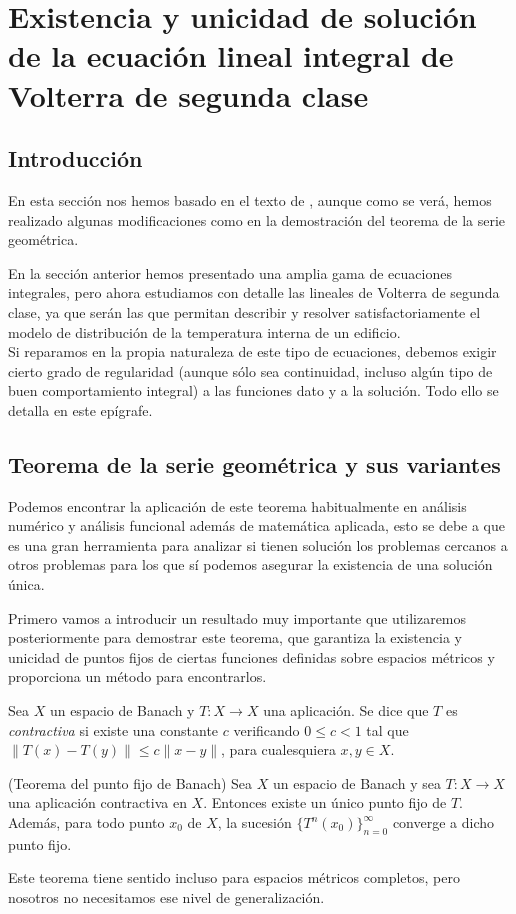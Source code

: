 \chapter{Existencia y unicidad de solución de la ecuación lineal integral de Volterra de segunda clase}
\section{Introducción}
En esta sección nos hemos basado en el texto de \cite{Atkinson}, aunque como se verá, hemos realizado algunas modificaciones como en la demostración del teorema de la serie geométrica.

En la sección anterior hemos presentado una amplia gama de ecuaciones integrales, pero ahora estudiamos con detalle las lineales de Volterra de segunda clase, ya que serán las que permitan describir y resolver satisfactoriamente el modelo de distribución de la temperatura interna de un edificio.\\ Si reparamos en la propia naturaleza de este tipo de ecuaciones, debemos exigir cierto grado de regularidad (aunque sólo sea continuidad, incluso algún tipo de buen comportamiento integral) a las funciones dato y a la solución. Todo ello se detalla en este epígrafe.
\section{Teorema de la serie geométrica y sus variantes}
Podemos encontrar la aplicación de este teorema habitualmente en análisis numérico y análisis funcional además de matemática aplicada, esto se debe a que es una gran herramienta para analizar si tienen solución los problemas cercanos a otros problemas para los que sí podemos asegurar la existencia de una solución única.

Primero vamos a introducir un resultado muy importante que utilizaremos posteriormente para demostrar este teorema, que garantiza la existencia y unicidad de puntos fijos de ciertas funciones definidas sobre espacios métricos y proporciona un método para encontrarlos.
\begin{definicion}
	Sea $X$ un espacio de Banach y $T:X \rightarrow X$ una aplicación. Se dice que $T$ es \textit{contractiva} si existe una constante $c$ verificando $0 \leqslant c < 1$ tal que $\lVert T(x) - T(y) \rVert \leqslant c \lVert x-y \rVert$, para cualesquiera $x, y \in X$.
\end{definicion}
\begin{teorema}
	(Teorema del punto fijo de Banach) Sea $X$ un espacio de Banach y sea $T:X \rightarrow X$ una aplicación contractiva en $X$. Entonces existe un único punto fijo de $T$.\\
	Además, para todo punto $x_0$ de $X$, la sucesión $\{T^n(x_{0})\}_{n=0}^\infty$ converge a dicho punto fijo.
\end{teorema}
Este teorema tiene sentido incluso para espacios métricos completos, pero nosotros no necesitamos ese nivel de generalización. 

